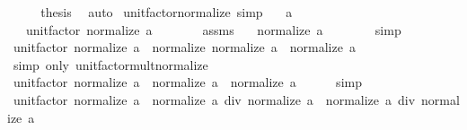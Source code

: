\begin{isabellebody}
\ \ \isamarkupfalse%
\ \isamarkupfalse%
\ {\isacharquery}{\kern0pt}thesis\ \isacommand{{\isachardot}{\kern0pt}{\isachardot}{\kern0pt}}\isamarkupfalse%
\isanewline
{}\isamarkupfalse%
\ auto%
\endisatagproof
{\isafoldproof}%
%
\isadelimproof
\isanewline
%
\endisadelimproof
\isanewline
{}\isamarkupfalse%
\ unit{\isacharunderscore}{\kern0pt}factor{\isacharunderscore}{\kern0pt}normalize\ {\isacharbrackleft}{\kern0pt}simp{\isacharbrackright}{\kern0pt}{\isacharcolon}{\kern0pt}\isanewline
\ \ \ {\isachardoublequoteopen}a\ {\isasymnoteq}\ {}{\isachardoublequoteclose}\isanewline
\ \ \ {\isachardoublequoteopen}unit{\isacharunderscore}{\kern0pt}factor\ {\isacharparenleft}{\kern0pt}normalize\ a{\isacharparenright}{\kern0pt}\ {\isacharequal}{\kern0pt}\ {}{\isachardoublequoteclose}\isanewline
%
\isadelimproof
%
\endisadelimproof
%
\isatagproof
{}\isamarkupfalse%
\ {\isacharminus}{\kern0pt}\isanewline
\ \ \isamarkupfalse%
\ assms\ \isamarkupfalse%
\ {\isacharasterisk}{\kern0pt}{\isacharcolon}{\kern0pt}\ {\isachardoublequoteopen}normalize\ a\ {\isasymnoteq}\ {}{\isachardoublequoteclose}\isanewline
\ \ \ \ \isamarkupfalse%
\ simp\isanewline
\ \ \isamarkupfalse%
\ {\isachardoublequoteopen}unit{\isacharunderscore}{\kern0pt}factor\ {\isacharparenleft}{\kern0pt}normalize\ a{\isacharparenright}{\kern0pt}\ {\isacharasterisk}{\kern0pt}\ normalize\ {\isacharparenleft}{\kern0pt}normalize\ a{\isacharparenright}{\kern0pt}\ {\isacharequal}{\kern0pt}\ normalize\ a{\isachardoublequoteclose}\isanewline
\ \ \ \ \isamarkupfalse%
\ {\isacharparenleft}{\kern0pt}simp\ only{\isacharcolon}{\kern0pt}\ unit{\isacharunderscore}{\kern0pt}factor{\isacharunderscore}{\kern0pt}mult{\isacharunderscore}{\kern0pt}normalize{\isacharparenright}{\kern0pt}\isanewline
\ \ \isamarkupfalse%
\ \isamarkupfalse%
\ {\isachardoublequoteopen}unit{\isacharunderscore}{\kern0pt}factor\ {\isacharparenleft}{\kern0pt}normalize\ a{\isacharparenright}{\kern0pt}\ {\isacharasterisk}{\kern0pt}\ normalize\ a\ {\isacharequal}{\kern0pt}\ normalize\ a{\isachardoublequoteclose}\isanewline
\ \ \ \ \isamarkupfalse%
\ simp\isanewline
\ \ \isamarkupfalse%
\ {\isacharasterisk}{\kern0pt}\ \isamarkupfalse%
\ {\isachardoublequoteopen}unit{\isacharunderscore}{\kern0pt}factor\ {\isacharparenleft}{\kern0pt}normalize\ a{\isacharparenright}{\kern0pt}\ {\isacharasterisk}{\kern0pt}\ normalize\ a\ div\ normalize\ a\ {\isacharequal}{\kern0pt}\ normalize\ a\ div\ normalize\ a{\isachardoublequoteclose}\isanewline

\end{isabellebody}
